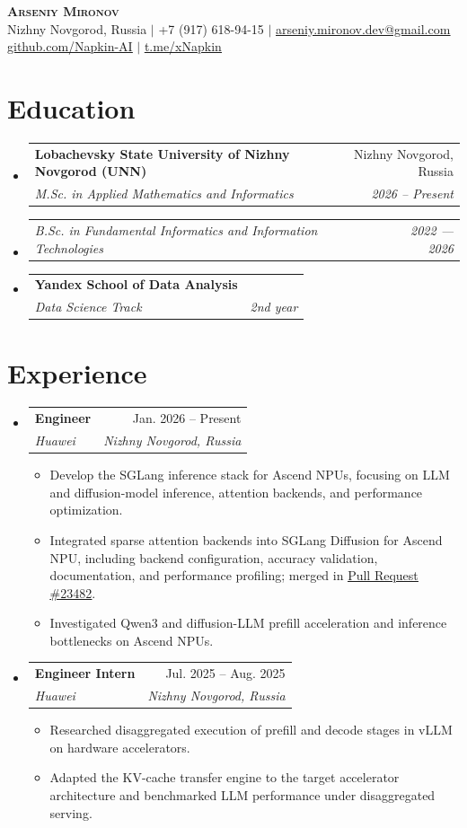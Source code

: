 \documentclass[letterpaper,10pt]{article}
\makeatletter
\newcommand{\resumeItem}[1]{\item\small{#1\vspace{-1pt}}}
\newcommand{\resumeSubheading}[4]{
  \vspace{0pt}\item
  \begin{tabular*}{0.98\textwidth}[t]{l@{\extracolsep{\fill}}r}
    \textbf{#1} & #2 \\
    \textit{\small #3} & \textit{\small #4} \\
  \end{tabular*}\vspace{-6pt}
}
\newcommand{\resumeSubSubheading}[2]{
  \item
  \begin{tabular*}{0.98\textwidth}{l@{\extracolsep{\fill}}r}
    \textit{\small #1} & \textit{\small #2} \\
  \end{tabular*}\vspace{-6pt}
}
\newcommand{\resumeSubHeadingListStart}{\begin{itemize}[leftmargin=0.14in,label={}]}
\newcommand{\resumeSubHeadingListEnd}{\end{itemize}}
\newcommand{\resumeItemListStart}{\begin{itemize}[leftmargin=0.22in,itemsep=1pt,topsep=2pt]}
\newcommand{\resumeItemListEnd}{\end{itemize}\vspace{-5pt}}
\makeatother
\begin{document}
\begin{center}
  \textbf{\Huge \scshape Arseniy Mironov} \\ \vspace{2pt}
  \small Nizhny Novgorod, Russia $|$ +7 (917) 618-94-15 $|$
  \href{mailto:arseniy.mironov.dev@gmail.com}{\underline{arseniy.mironov.dev@gmail.com}} \\
  \href{https://github.com/Napkin-AI}{\underline{github.com/Napkin-AI}} $|$
  \href{https://t.me/xNapkin}{\underline{t.me/xNapkin}}
\end{center}

\section{Education}
\resumeSubHeadingListStart
  \resumeSubheading
    {Lobachevsky State University of Nizhny Novgorod (UNN)}{Nizhny Novgorod, Russia}
    {M.Sc. in Applied Mathematics and Informatics}{2026 -- Present}
  \resumeSubSubheading
    {B.Sc. in Fundamental Informatics and Information Technologies}{2022 --- 2026}
  \resumeSubheading
    {Yandex School of Data Analysis}{ }
    {Data Science Track}{2nd year}
\resumeSubHeadingListEnd

\section{Experience}
\resumeSubHeadingListStart
  \resumeSubheading
    {Engineer}{Jan. 2026 -- Present}
    {Huawei}{Nizhny Novgorod, Russia}
  \resumeItemListStart
    \resumeItem{Develop the SGLang inference stack for Ascend NPUs, focusing on LLM and diffusion-model inference, attention backends, and performance optimization.}
    \resumeItem{Integrated sparse attention backends into SGLang Diffusion for Ascend NPU, including backend configuration, accuracy validation, documentation, and performance profiling; merged in \href{https://github.com/sgl-project/sglang/pull/23482}{\underline{Pull Request \#23482}}.}
    \resumeItem{Investigated Qwen3 and diffusion-LLM prefill acceleration and inference bottlenecks on Ascend NPUs.}
  \resumeItemListEnd

  \resumeSubheading
    {Engineer Intern}{Jul. 2025 -- Aug. 2025}
    {Huawei}{Nizhny Novgorod, Russia}
  \resumeItemListStart
    \resumeItem{Researched disaggregated execution of prefill and decode stages in vLLM on hardware accelerators.}
    \resumeItem{Adapted the KV-cache transfer engine to the target accelerator architecture and benchmarked LLM performance under disaggregated serving.}
  \resumeItemListEnd
\resumeSubHeadingListEnd
\end{document}
